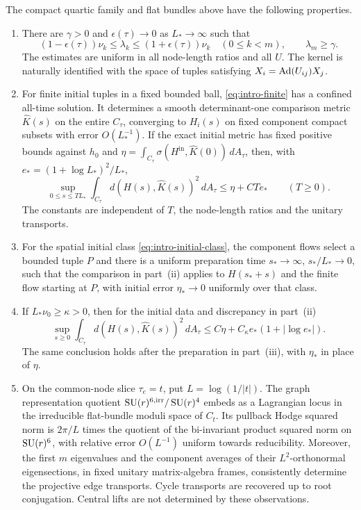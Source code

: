 \begin{theorem}\label{thm:main}
The compact quartic family and flat bundles above
have the following properties.
\begin{enumerate}
\renewcommand{\labelenumi}{(\roman{enumi})}
\item There are $\gamma>0$ and $\epsilon(\tau)\to0$
as $L_*\to\infty$ such that
\[
 (1-\epsilon(\tau))\nu_k\le\lambda_k
 \le(1+\epsilon(\tau))\nu_k\quad(0\le k<m),
 \qquad \lambda_m\ge\gamma .
\]
The estimates are uniform in all node-length ratios
and all $U$. The kernel is naturally identified with the space of
tuples satisfying $X_i=\operatorname{Ad}(U_{ij})X_j$.

\item For finite initial tuples in a fixed bounded
ball, \eqref{eq:intro-finite} has a confined
all-time solution. It determines a smooth
determinant-one comparison metric $\widehat K(s)$
on the entire $C_\tau$, converging to $H_i(s)$
on fixed component compact subsets with error
$O(L_*^{-1})$. If the exact initial metric has
fixed positive bounds against $h_0$ and
$\eta=\int_{C_\tau}\sigma(H^{\mathrm{in}},\widehat K(0))\,dA_\tau$,
then, with $e_*=(1+\log L_*)^2/L_*$,
\[
 \sup_{0\le s\le TL_*}\int_{C_\tau}
       d(H(s),\widehat K(s))^2\,dA_\tau
       \le\eta+CTe_*\qquad(T\ge0).
\]
The constants are independent of $T$, the
node-length ratios and the unitary transports.

\item For the spatial initial class
\eqref{eq:intro-initial-class}, the component
flows select a bounded tuple $P$ and there is
a uniform preparation time $s_*\to\infty$,
$s_*/L_*\to0$, such that the comparison in
part~{\rm(ii)} applies to $H(s_*+s)$ and the
finite flow starting at $P$, with initial
error $\eta_*\to0$ uniformly over that class.

\item If $L_*\nu_0\ge\kappa>0$, then for the
initial data and discrepancy in part~{\rm(ii)}
\[
 \sup_{s\ge0}\int_{C_\tau}d(H(s),\widehat K(s))^2\,dA_\tau
 \le C\eta+C_\kappa e_*(1+|\log e_*|).
\]
The same conclusion holds after the preparation
in part~{\rm(iii)}, with $\eta_*$ in place of $\eta$.

\item On the common-node slice $\tau_e=t$, put
$L=\log(1/|t|)$. The graph representation
quotient $\operatorname{SU}(r)^{6,\mathrm{irr}}/\operatorname{SU}(r)^4$
embeds as a Lagrangian locus in the irreducible
flat-bundle moduli space of $C_t$.
Its pullback Hodge squared norm is $2\pi/L$
times the quotient of the bi-invariant product
squared norm on $\operatorname{SU}(r)^6$, with relative
error $O(L^{-1})$ uniform towards reducibility.
Moreover, the first $m$ eigenvalues and the
component averages of their $L^2$-orthonormal
eigensections, in fixed unitary matrix-algebra
frames, consistently determine the projective
edge transports. Cycle transports are recovered
up to root conjugation. Central lifts are not
determined by these observations.
\end{enumerate}
\end{theorem}
